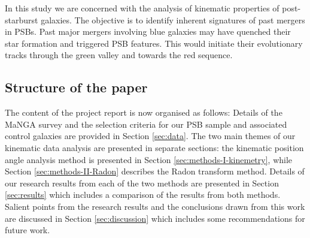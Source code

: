 In this study we are concerned with the analysis of kinematic properties of post-starburst galaxies. The objective is to identify inherent signatures of past mergers in PSBs. Past major mergers involving blue galaxies may have quenched their star formation and triggered PSB features.  This would initiate their evolutionary tracks through the green valley and towards the red sequence. 

\subsection{Structure of the paper}
The content of the project report is now organised as follows: Details of the MaNGA survey and the selection criteria for our PSB sample and associated control galaxies are provided in Section \ref{sec:data}. The two main themes of our kinematic data analysis are presented in separate sections: the kinematic position angle  analysis method is presented in Section \ref{sec:methods-I-kinemetry}, while Section \ref{sec:methods-II-Radon} describes the Radon transform method. Details of our research results from each of the two methods are presented in Section \ref{sec:results} which includes a comparison of the results from both methods. Salient points from the research results and the conclusions drawn from this work are discussed in Section \ref{sec:discussion} which includes some recommendations for future work.
